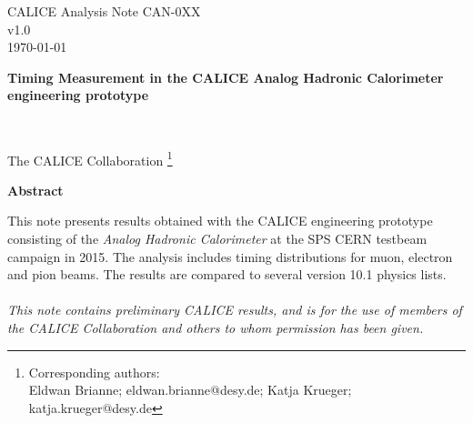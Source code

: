 \begin{titlepage}
\begin{flushright}
CALICE Analysis Note CAN-0XX\\
v1.0\\
\today\\
\end{flushright}

\begin{center}
\vspace*{\fill}
\begin{LARGE} \textbf{Timing Measurement in the CALICE Analog Hadronic Calorimeter engineering prototype} \end{LARGE} \\ [10ex]
\begin{Large} The CALICE Collaboration \footnote{Corresponding authors: \\ Eldwan Brianne; eldwan.brianne@desy.de; Katja Krueger; katja.krueger@desy.de}\\ [10ex]
\end{Large}

\begin{large}
\textbf{Abstract} \\
\end{large}
\end{center}
This note presents results obtained with the CALICE engineering prototype consisting of the \emph{Analog Hadronic Calorimeter} at the SPS CERN testbeam campaign in 2015. The analysis includes timing distributions for muon, electron and pion beams. The results are compared to several \geant version 10.1 physics lists.\\
\\

\textit{
This note contains preliminary CALICE results, and is for the use of members of the CALICE Collaboration and others to whom permission has been given.}

\end{titlepage}
